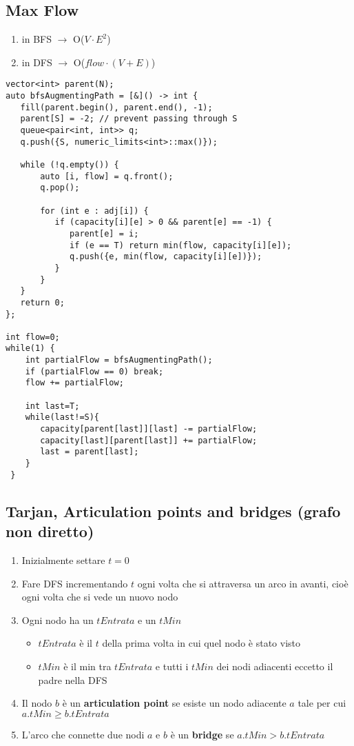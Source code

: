 \documentclass{article}
\begin{document}
\subsection{Max Flow}
\begin{enumerate}
    \item in BFS $\rightarrow$ O($V\cdot E^2$)
    \item in DFS $\rightarrow$ O($flow\cdot (V+E)$)
\end{enumerate}
\begin{lstlisting}
vector<int> parent(N);
auto bfsAugmentingPath = [&]() -> int {
   fill(parent.begin(), parent.end(), -1);
   parent[S] = -2; // prevent passing through S
   queue<pair<int, int>> q;
   q.push({S, numeric_limits<int>::max()});

   while (!q.empty()) {
       auto [i, flow] = q.front();
       q.pop();

       for (int e : adj[i]) {
          if (capacity[i][e] > 0 && parent[e] == -1) {
             parent[e] = i;
             if (e == T) return min(flow, capacity[i][e]);
             q.push({e, min(flow, capacity[i][e])});
          }
       }
   }
   return 0;
};

int flow=0;
while(1) {
    int partialFlow = bfsAugmentingPath();
    if (partialFlow == 0) break;
    flow += partialFlow;

    int last=T;
    while(last!=S){
       capacity[parent[last]][last] -= partialFlow;
       capacity[last][parent[last]] += partialFlow;
       last = parent[last];
    }
 }
\end{lstlisting}

\subsection{Tarjan, Articulation points and bridges (grafo non diretto)}
\begin{enumerate}
    \item Inizialmente settare $t=0$
    \item Fare DFS incrementando $t$ ogni volta che si attraversa un arco in avanti, cioè ogni volta che si vede un nuovo nodo
    \item Ogni nodo ha un $tEntrata$ e un $tMin$
    \begin{itemize}
        \item $tEntrata$ è il $t$ della prima volta in cui quel nodo è stato visto
        \item $tMin$ è il min tra $tEntrata$ e tutti i $tMin$ dei nodi adiacenti eccetto il padre nella DFS
    \end{itemize}
    \item Il nodo $b$ è un \textbf{articulation point} se esiste un nodo adiacente $a$ tale per cui $a.tMin \geq b.tEntrata$
    \item L'arco che connette due nodi $a$ e $b$ è un \textbf{bridge} se $a.tMin > b.tEntrata$
\end{enumerate}
\end{document}
